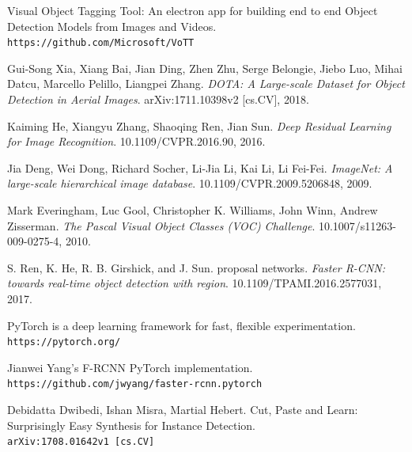 \documentclass[]{article}
\begin{document}
\begin{thebibliography}{9}
	Visual Object Tagging Tool: An electron app for building end to end Object Detection Models from Images and Videos.
	\\\texttt{https://github.com/Microsoft/VoTT}
	
	Gui-Song Xia, Xiang Bai, Jian Ding, Zhen Zhu, Serge Belongie, Jiebo Luo, Mihai Datcu, Marcello Pelillo, Liangpei Zhang.
	\textit{DOTA: A Large-scale Dataset for Object Detection in Aerial Images}. 
	arXiv:1711.10398v2 [cs.CV], 2018.
	
	Kaiming He, Xiangyu Zhang, Shaoqing Ren, Jian Sun.
	\textit{Deep Residual Learning for Image Recognition}. 
	10.1109/CVPR.2016.90, 2016.
	
	 Jia Deng, Wei Dong, Richard Socher, Li-Jia Li, Kai Li, Li Fei-Fei.
	\textit{ImageNet: A large-scale hierarchical image database}. 
	10.1109/CVPR.2009.5206848, 2009.
	
	Mark Everingham, Luc Gool, Christopher K. Williams, John Winn, Andrew Zisserman.
	\textit{The Pascal Visual Object Classes (VOC) Challenge}. 
	10.1007/s11263-009-0275-4, 2010.
	
	S. Ren, K. He, R. B. Girshick, and J. Sun.
	proposal networks.
	\textit{Faster R-CNN: towards real-time object detection with region}. 
	10.1109/TPAMI.2016.2577031, 2017.
	
	PyTorch is a deep learning framework for fast, flexible experimentation.
	\\\texttt{https://pytorch.org/}
	
	Jianwei Yang's F-RCNN PyTorch implementation.
	\\\texttt{https://github.com/jwyang/faster-rcnn.pytorch}
	
	Debidatta Dwibedi, Ishan Misra, Martial Hebert. Cut, Paste and Learn: Surprisingly Easy Synthesis for Instance Detection.
	\\\texttt{arXiv:1708.01642v1 [cs.CV]}
	
\end{thebibliography}
\end{document}
